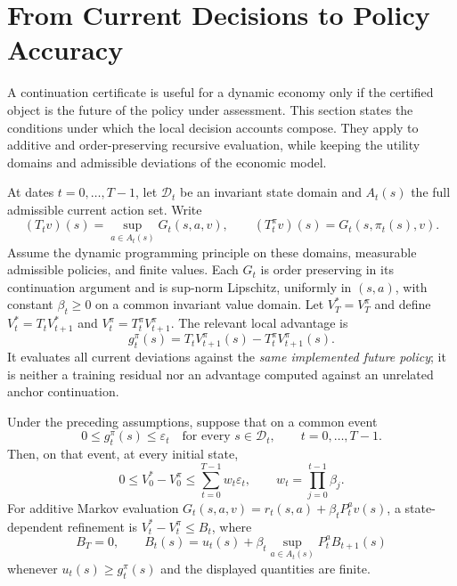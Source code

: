 \section{From Current Decisions to Policy Accuracy}\label{sec:r21composition}
A continuation certificate is useful for a dynamic economy only if the
certified object is the future of the policy under assessment. This section
states the conditions under which the local decision accounts compose.
They apply to additive and order-preserving recursive evaluation, while
keeping the utility domains and admissible deviations of the economic model.

At dates $t=0,\ldots,T-1$, let $\mathcal D_t$ be an invariant state domain
and $A_t(s)$ the full admissible current action set. Write
\[
 (T_t v)(s)=\sup_{a\in A_t(s)}G_t(s,a,v),\qquad
 (T_t^\pi v)(s)=G_t(s,\pi_t(s),v).
\]
Assume the dynamic programming principle on these domains, measurable
admissible policies, and finite values. Each $G_t$ is order preserving in its
continuation argument and is sup-norm Lipschitz, uniformly in $(s,a)$, with
constant $\beta_t\geq0$ on a common invariant value domain. Let
$V_T^*=V_T^\pi$ and define $V_t^*=T_tV_{t+1}^*$ and
$V_t^\pi=T_t^\pi V_{t+1}^\pi$. The relevant local advantage is
\begin{equation}
 g_t^\pi(s)=T_tV_{t+1}^\pi(s)-T_t^\pi V_{t+1}^\pi(s).
 \label{eq:r21advantage}
\end{equation}
It evaluates all current deviations against the \emph{same implemented
future policy}; it is neither a training residual nor an advantage computed
against an unrelated anchor continuation.

\begin{theorem}\label{thm:r21composition}
Under the preceding assumptions, suppose that on a common event
\begin{equation}
 0\leq g_t^\pi(s)\leq\varepsilon_t
 \quad\text{for every }s\in\mathcal D_t,
 \qquad t=0,\ldots,T-1.
 \label{eq:r21uniform}
\end{equation}
Then, on that event, at every initial state,
\begin{equation}
 0\leq V_0^*-V_0^\pi\leq
 \sum_{t=0}^{T-1}w_t\varepsilon_t,
 \qquad w_t=\prod_{j=0}^{t-1}\beta_j.
 \label{eq:r21composition}
\end{equation}
For additive Markov evaluation
$G_t(s,a,v)=r_t(s,a)+\beta_tP_t^av(s)$, a state-dependent refinement is
$V_t^*-V_t^\pi\leq B_t$, where
\begin{equation}
 B_T=0,\qquad
 B_t(s)=u_t(s)+\beta_t\sup_{a\in A_t(s)}P_t^aB_{t+1}(s)
 \label{eq:r21envelope}
\end{equation}
whenever $u_t(s)\geq g_t^\pi(s)$ and the displayed quantities are finite.
\end{theorem}

